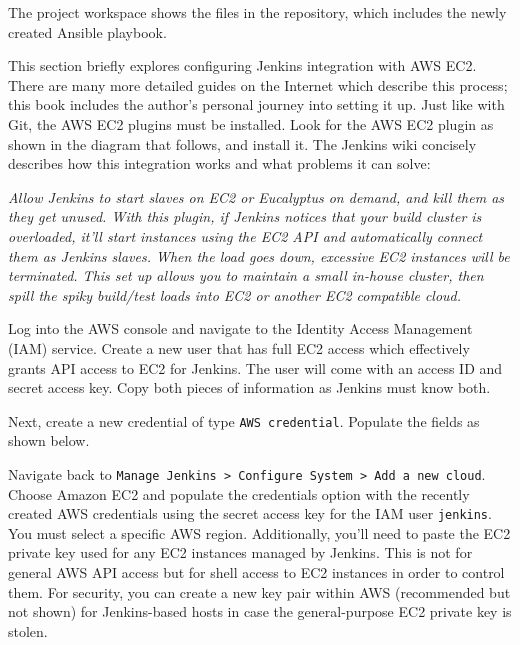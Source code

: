 The project workspace shows the files in the repository, which includes
the newly created Ansible playbook.


This section briefly explores configuring Jenkins integration with AWS EC2.
There are many more detailed guides on the Internet which describe this
process; this book includes the author's personal journey into setting it up.
Just like with Git, the AWS EC2 plugins must be installed. Look for the AWS
EC2 plugin as shown in the diagram that follows, and install it. The Jenkins wiki
concisely describes how this integration works and what problems it can solve:

\textit{
Allow Jenkins to start slaves on EC2 or Eucalyptus on demand, and kill them as
they get unused. With this plugin, if Jenkins notices that your build cluster
is overloaded, it'll start instances using the EC2 API and automatically
connect them as Jenkins slaves. When the load goes down, excessive EC2
instances will be terminated. This set up allows you to maintain a small
in-house cluster, then spill the spiky build/test loads into EC2 or another
EC2 compatible cloud.
}


Log into the AWS console and navigate to the Identity Access Management (IAM)
service. Create a new user that has full EC2 access which effectively grants
API access to EC2 for Jenkins. The user will come with an access ID and secret
access key. Copy both pieces of information as Jenkins must know both.


Next, create a new credential of type \verb|AWS credential|. Populate the
fields as shown below.


Navigate back to \verb|Manage Jenkins > Configure System > Add a new cloud|.
Choose Amazon EC2 and populate the credentials option with the recently
created AWS credentials using the secret access key for the IAM user
\verb|jenkins|. You must select a specific AWS region. Additionally, you'll
need to paste the EC2 private key used for any EC2 instances managed by
Jenkins. This is not for general AWS API access but for shell access to EC2
instances in order to control them. For security, you can create a new key
pair within AWS (recommended but not shown) for Jenkins-based hosts in case
the general-purpose EC2 private key is stolen.


